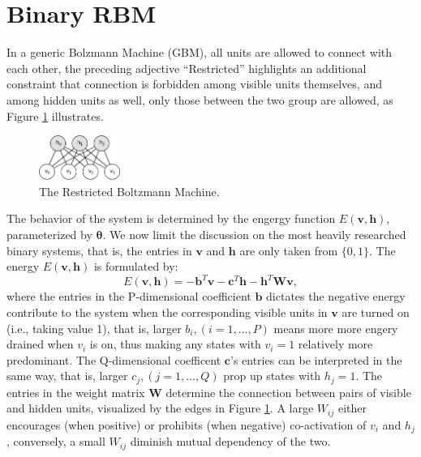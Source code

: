 \documentclass[11pt]{article}
\newcommand{\vb}{\boldsymbol{b}}
\newcommand{\vc}{\boldsymbol{c}}
\newcommand{\vh}{\boldsymbol{h}}
\newcommand{\vv}{\boldsymbol{v}}
\newcommand{\mw}{\boldsymbol{W}}
\newcommand{\pEC}{\boldsymbol{\theta}}
\begin{document}
{\section{Binary RBM}
In a generic Bolzmann Machine (GBM), all units are allowed to connect with each other, the preceding adjective ``Restricted'' highlights an additional constraint that connection is forbidden among visible units themselves, and among hidden units as well, only those between the two group are allowed, as Figure \ref{fig:rbm} illustrates.
\begin{figure}[h]
  \centering
  \includegraphics[width=100px]{img/rbm.png}
  \caption{The Restricted Boltzmann Machine.}\label{fig:rbm}
\end{figure}
The behavior of the system is determined by the engergy function $E(\vv, \vh)$, parameterized by $\pEC$. We now limit the discussion on the most heavily researched binary systems, that is, the entries in $\vv$ and $\vh$ are only taken from $\{0, 1\}$. The energy $E(\vv, \vh)$ is formulated by:
\begin{equation} \label{eq:se_bin}
  E(\vv, \vh) = -\vb^T \vv - \vc^T \vh - \vh^T \mw \vv,
\end{equation}
where the entries in the P-dimensional coefficient $\vb$ dictates the negative energy contribute to the system when the corresponding visible units in $\vv$ are turned on (i.e., taking value 1), that is, larger $b_i, (i=1, \dots, P)$ means more more engery drained when $v_i$ is on, thus making any states with $v_i=1$ relatively more predominant. The Q-dimensional coefficent $\vc$'s entries can be interpreted in the same way, that is, larger $c_j, (j=1, \dots, Q)$ prop up states with $h_j=1$. The entries in the weight matrix $\mw$ determine the connection between pairs of visible and hidden units, visualized by the edges in Figure \ref{fig:rbm}. A large $W_{ij}$ either encourages (when positive) or prohibits (when negative) co-activation of $v_i$ and $h_j$, conversely, a small $W_{ij}$ diminish mutual dependency of the two.
}
\end{document}
